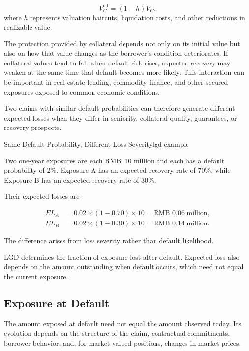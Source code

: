 \begin{equation}
V_C^{\mathrm{eff}}
=(1-h)V_C,
\label{eq:ch19-effective-collateral}
\end{equation}
where \(h\) represents valuation haircuts, liquidation costs, and other reductions in realizable value.

The protection provided by collateral depends not only on its initial value but also on how that value changes as the borrower's condition deteriorates. If collateral values tend to fall when default risk rises, expected recovery may weaken at the same time that default becomes more likely. This interaction can be important in real-estate lending, commodity finance, and other secured exposures exposed to common economic conditions.

Two claims with similar default probabilities can therefore generate different expected losses when they differ in seniority, collateral quality, guarantees, or recovery prospects.

\begin{example}{Same Default Probability, Different Loss Severity}{lgd-example}

Two one-year exposures are each RMB~10 million and each has a default probability of 2\%. Exposure A has an expected recovery rate of 70\%, while Exposure B has an expected recovery rate of 30\%.

Their expected losses are

\begin{align*}
EL_A
&=
0.02\times(1-0.70)\times10
=
\text{RMB~}0.06 \text{ million},\\
EL_B
&=
0.02\times(1-0.30)\times10
=
\text{RMB~}0.14 \text{ million}.
\end{align*}


The difference arises from loss severity rather than default likelihood.

\end{example}

LGD determines the fraction of exposure lost after default. Expected loss also depends on the amount outstanding when default occurs, which need not equal the current exposure.


\subsection{Exposure at Default}

The amount exposed at default need not equal the amount observed today. Its evolution depends on the structure of the claim, contractual commitments, borrower behavior, and, for market-valued positions, changes in market prices.


